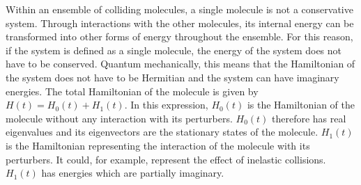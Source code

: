\documentclass[11pt]{article}
\begin{document}
Within an ensemble of colliding molecules, a single molecule is not a
conservative system.  Through interactions with the other molecules, its
internal energy can be transformed into other forms of energy throughout
the ensemble.  For this reason, if the system is defined as a single 
molecule, the energy of the system does not have to be conserved.  
Quantum mechanically,
this means that the Hamiltonian of the system does not have to be Hermitian
and the system can have imaginary energies.  The total Hamiltonian 
of the molecule is given by $H(t)=H_{0}(t)+ H_{1}(t)$.  In this
expression, $H_{0}(t)$ is the Hamiltonian of the molecule without any
interaction with its perturbers.  $H_{0}(t)$ therefore has real eigenvalues
and its eigenvectors are the stationary states of the molecule.  
$H_{1}(t)$ is the Hamiltonian representing the interaction of the molecule
with its perturbers. It could, for example, represent the effect of 
inelastic collisions.  $H_{1}(t)$ has energies which are partially 
imaginary.
\end{document}
